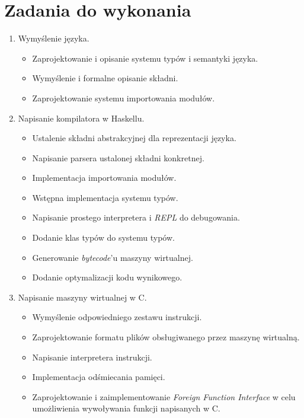 \documentclass[12pt, a4paper, oneside]{report}
\begin{document}
\section*{Zadania do wykonania}
\begin{enumerate}

    \item Wymyślenie języka.
    \begin{itemize}
        \item Zaprojektowanie i opisanie systemu typów i semantyki języka.
        \item Wymyślenie i formalne opisanie składni.
        \item Zaprojektowanie systemu importowania modułów.
    \end{itemize}

    \item Napisanie kompilatora w Haskellu.
    \begin{itemize}
        \item Ustalenie składni abstrakcyjnej dla reprezentacji języka.
        \item Napisanie parsera ustalonej składni konkretnej.
        \item Implementacja importowania modułów.
        \item Wstępna implementacja systemu typów.
        \item Napisanie prostego interpretera i \textit{REPL} do debugowania.
        \item Dodanie klas typów do systemu typów.
        \item Generowanie \textit{bytecode}'u maszyny wirtualnej.
        \item Dodanie optymalizacji kodu wynikowego.
    \end{itemize}

    \item Napisanie maszyny wirtualnej w C.
    \begin{itemize}
        \item Wymyślenie odpowiedniego zestawu instrukcji.
        \item Zaprojektowanie formatu plików obsługiwanego przez maszynę 
              wirtualną.
        \item Napisanie interpretera instrukcji.
        \item Implementacja odśmiecania pamięci.
        \item Zaprojektowanie i zaimplementowanie 
              \textit{Foreign Function Interface} w celu umożliwienia
              wywoływania funkcji napisanych w C.
    \end{itemize}


\end{enumerate}
\end{document}
